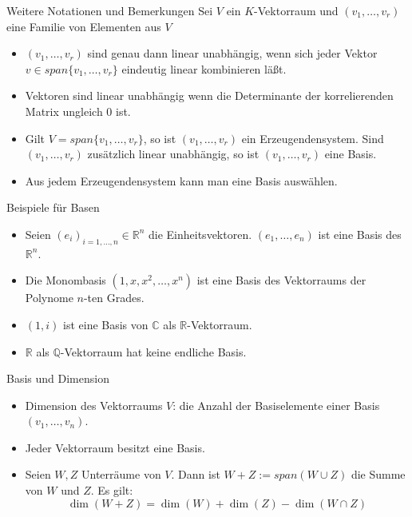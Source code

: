 \documentclass[notes=hide,hyperref={dvipdfmx,pdfpagelabels=false}]{beamer}
\begin{document}
\begin{frame}{Weitere Notationen und Bemerkungen}
Sei $V$ ein $K$-Vektorraum und $(v_1,\dots ,v_r)$ eine Familie von
Elementen aus $V$
\begin{itemize}
\item $(v_1,\dots ,v_r)$ sind genau dann linear unabhängig, wenn sich
jeder Vektor $v \in span\{v_1, \dots ,v_r\}$ eindeutig linear kombinieren
läßt. 
\item Vektoren sind linear unabhängig wenn die Determinante der korrelierenden Matrix ungleich 0 ist.
\item Gilt $V=span\{v_1,\dots ,v_r \}$, so ist $(v_1, \dots ,v_r)$ ein
{\color{red} Erzeugendensystem}. Sind $(v_1, \dots ,v_r)$ zusätzlich linear
unabhängig, so ist $(v_1, \dots ,v_r)$ eine {\color{red} Basis}.
\item Aus jedem Erzeugendensystem kann man eine Basis auswählen. 
\end{itemize}
\end{frame}


\begin{frame}{Beispiele für Basen}
\begin{itemize}
\item Seien $(e_i)_{i=1,\ldots,n} \in \mathbb{R}^n$ die Einheitsvektoren. $(e_1, \dots
,e_n)$ ist eine Basis des $\mathbb{R}^n$.
\item Die Monombasis $(1,x,x^2,\dots, x^n)$ ist eine Basis des
Vektorraums der Polynome $n$-ten Grades.
\item $(1,i)$ ist eine Basis von $\mathbb{C}$ als
$\mathbb{R}$-Vektorraum. 
\item $\mathbb{R}$ als $\mathbb{Q}$-Vektorraum hat keine endliche
Basis. 
\end{itemize}
\end{frame}

\begin{frame}{Basis und Dimension}
\begin{itemize}
\item {\color{red} Dimension} des Vektorraums $V$: die  Anzahl der Basiselemente einer Basis $(v_1,\dots, v_n)$.
\item Jeder Vektorraum besitzt eine Basis.
\item Seien $W,Z$ Unterräume von $V$. Dann ist {\color{red} $W+Z:=span(W \cup Z)$}
die {\color{red} Summe} von $W$ und $Z$. Es gilt:
\[ \dim(W+Z)=\dim(W) + \dim (Z) - \dim( W \cap Z) \]
\end{itemize}
\end{frame}
\end{document}
